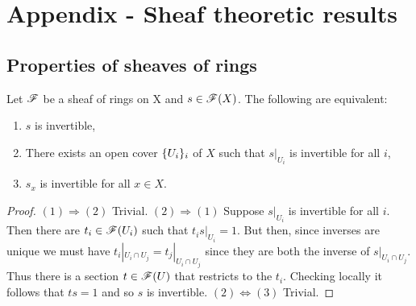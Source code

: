 \documentclass{memoir}
\begin{document}
\chapter{Appendix - Sheaf theoretic results}
\section{Properties of sheaves of rings}
\begin{thm}
    Let $\mathscr{F}$ be a sheaf of rings on X and $s\in \mathscr{F}(X)$.
    The following are equivalent:
    \begin{enumerate}
        \item $s$ is invertible,
        \item There exists an open cover $\lbrace U_i\rbrace_i$ of $X$ such that $s|_{U_i}$ is invertible for all $i$,
        \item $s_x$ is invertible for all $x\in X$.
    \end{enumerate}
\end{thm}
\begin{proof}
    $(1)\Rightarrow(2)$ Trivial. 
    $(2)\Rightarrow (1)$ Suppose $s|_{U_i}$ is invertible for all $i$.
    Then there are $t_i\in\mathscr{F}(U_i)$ such that $t_is|_{U_i} = 1$.
    But then, since inverses are unique we must have $t_i|_{U_i\cap U_j} = t_j|_{U_i\cap U_j}$ since they are both the inverse of $s|_{U_i\cap U_j}$.
    Thus there is a section $t\in \mathscr{F}(U)$ that restricts to the $t_i$.
    Checking locally it follows that $ts = 1$ and so $s$ is invertible.
    $(2)\Leftrightarrow(3)$ Trivial.
\end{proof}
\end{document}
